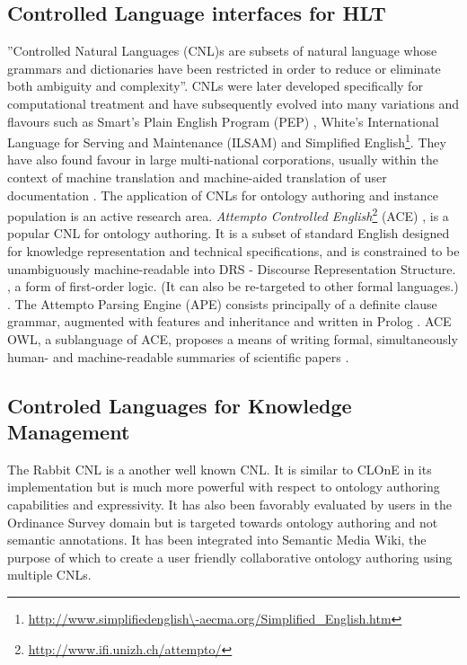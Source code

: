 \subsection{Controlled Language interfaces for HLT}
''Controlled Natural Languages (CNL)s are subsets of natural language
whose grammars and dictionaries have been restricted in order to
reduce or eliminate both ambiguity and complexity''\cite{schwitter}.
CNLs were later developed specifically for computational treatment and
have subsequently evolved into many variations and flavours such as
Smart's Plain English Program (PEP) \cite{Adr92a}, White's
International Language for Serving and Maintenance (ILSAM)
\cite{Adr92a} and Simplified English\footnote{\url{http://www.simplifiedenglish\-aecma.org/Simplified\_English.htm}}.
They have also found favour in large multi-national corporations,
usually within the context of machine translation and machine-aided
translation of user documentation \cite{schwitter,Adr92a}.
The application of CNLs for ontology authoring and instance
population is an active research area.  \emph{Attempto Controlled
  English}\footnote{\url{http://www.ifi.unizh.ch/attempto/}} (ACE)
\cite{Fuc96a}, is a popular CNL for ontology authoring.  It is a subset
of standard English designed for knowledge representation and
technical specifications, and is constrained to be unambiguously
machine-readable into DRS - Discourse Representation Structure.
, a form of first-order logic.  (It can also be re-targeted to other formal
languages.) \cite{Fuchs06}.  The Attempto Parsing Engine (APE)
consists principally of a definite clause grammar, augmented with 
features and inheritance and written in Prolog \cite{Hoefler04}. 
ACE OWL, a sublanguage of ACE, proposes a means of writing formal,
simultaneously human- and machine-readable summaries of scientific
papers \cite{Kaljurand06,Kuhn06}.

\subsection{Controled Languages for Knowledge Management}
The Rabbit CNL is a another well known CNL\cite{dimitrova08}.  It is similar to 
CLOnE in its implementation but is much more powerful with respect to
ontology authoring capabilities and expressivity. It has also been favorably
evaluated by users in the Ordinance Survey domain but is targeted towards
ontology authoring and not semantic annotations. It has been integrated into
Semantic Media Wiki, the purpose of which to create a user friendly collaborative
ontology authoring using multiple CNLs\cite{Bao09}. 

